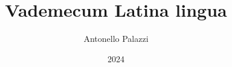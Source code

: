 \documentclass[a4paper, 12pt, twoside]{report}
\begin{document}
\author{Antonello Palazzi}
\title{Vademecum Latina lingua}
\date{2024}
\maketitle
\tableofcontents
\clearpage


\end{document}
